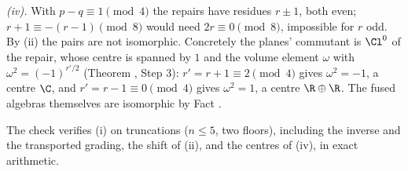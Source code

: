 \emph{(iv).} With $p - q \equiv 1 \pmod 4$ the repairs have residues $r \pm 1$, both even; $r + 1 \equiv -(r - 1) \pmod 8$ would need $2r \equiv 0 \pmod 8$, impossible for $r$ odd. By (ii) the pairs are not isomorphic. Concretely the planes' commutant is $\Cl^{0}$ of the repair, whose centre is spanned by $1$ and the volume element $\omega$ with $\omega^{2} = (-1)^{r'/2}$ (Theorem , Step 3): $r' = r + 1 \equiv 2 \pmod 4$ gives $\omega^{2} = -1$, a centre $\C$, and $r' = r - 1 \equiv 0 \pmod 4$ gives $\omega^{2} = 1$, a centre $\R \oplus \R$. The fused algebras themselves are isomorphic by Fact .

The check verifies (i) on truncations ($n \le 5$, two floors), including the inverse and the transported grading, the shift of (ii), and the centres of (iv), in exact arithmetic.
